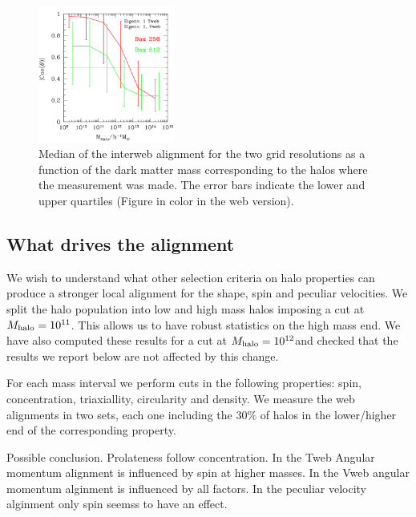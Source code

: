 \documentclass[useAMS,usenatbib]{mn2e}
\newcommand{\hMsun}{{\ifmmode{h^{-1}{\rm
        {M_{\odot}}}}\else{$h^{-1}{\rm{M_{\odot}}}$~}\fi}}
\begin{document}
\begin{figure}
\includegraphics[width=0.40\textwidth]{web.pdf}
\caption{Median of the interweb alignment for the two grid
  resolutions as a function of the dark matter mass corresponding to
  the halos where the measurement was made. The error bars indicate
  the lower and upper quartiles (Figure in color in the web version).
\label{fig:interweb}} 
\end{figure}


\subsection{What drives the alignment}

We wish to understand what other selection criteria on halo
properties can produce a stronger local alignment for the shape, spin
and peculiar velocities. We split the halo population into low and
high mass halos imposing a cut at $M_{\rm halo}=10^{11}$\hMsun. This
allows us to have robust statistics on the high mass end. We have also
computed these results for a cut at $M_{\rm halo}=10^{12}$\hMsun and
checked that the results we report below are not affected by this
change.

For each mass interval we perform cuts in the following properties:
spin, concentration, triaxiallity, circularity  and density. We
measure the web alignments in two sets, each one including the $30\%$
of halos in the lower/higher end of the corresponding property.



Possible conclusion. Prolateness follow concentration. In the Tweb
Angular momentum alignment is influenced by spin at higher masses. In
the Vweb angular momentum alginment is influenced by all factors. In
the peculiar velocity alginment only spin seemss to have an effect. 
\end{document}
